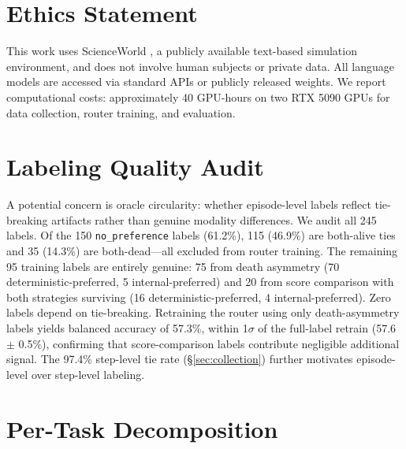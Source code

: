 \documentclass[11pt]{article}
\begin{document}
\section*{Ethics Statement}

This work uses ScienceWorld \cite{scienceworld-2022}, a publicly available text-based simulation environment, and does not involve human subjects or private data. All language models are accessed via standard APIs or publicly released weights. We report computational costs: approximately 40 GPU-hours on two RTX 5090 GPUs for data collection, router training, and evaluation.



\appendix

\section{Labeling Quality Audit}
\label{app:labeling}

A potential concern is oracle circularity: whether episode-level labels reflect tie-breaking artifacts rather than genuine modality differences. We audit all 245 labels. Of the 150 \texttt{no\_preference} labels (61.2\%), 115 (46.9\%) are both-alive ties and 35 (14.3\%) are both-dead---all excluded from router training. The remaining 95 training labels are entirely genuine: 75 from death asymmetry (70 deterministic-preferred, 5 internal-preferred) and 20 from score comparison with both strategies surviving (16 deterministic-preferred, 4 internal-preferred). Zero labels depend on tie-breaking. Retraining the router using only death-asymmetry labels yields balanced accuracy of 57.3\%, within 1$\sigma$ of the full-label retrain (57.6 $\pm$ 0.5\%), confirming that score-comparison labels contribute negligible additional signal. The 97.4\% step-level tie rate (\S\ref{sec:collection}) further motivates episode-level over step-level labeling.

\section{Per-Task Decomposition}
\label{app:per-task}
\end{document}
